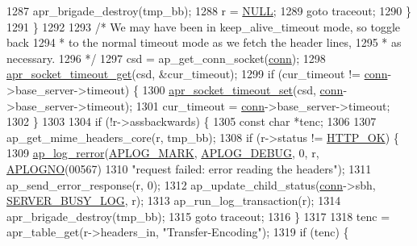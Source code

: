 \begin{DoxyCode}
{1287             apr\_brigade\_destroy(tmp\_bb);
1288             r = \hyperlink{pcre_8txt_ad7f989d16aa8ca809a36bc392c07fba1}{NULL};
1289             \textcolor{keywordflow}{goto} traceout;
1290         \}
1291     \}
1292 
1293     \textcolor{comment}{/* We may have been in keep\_alive\_timeout mode, so toggle back}
1294 \textcolor{comment}{     * to the normal timeout mode as we fetch the header lines,}
1295 \textcolor{comment}{     * as necessary.}
1296 \textcolor{comment}{     */}
1297     csd = ap\_get\_conn\_socket(\hyperlink{group__MOD__PROXY_gaaf2a99e7e3709d3e41bf0a33f1004b4e}{conn});
1298     \hyperlink{unix_2sockopt_8c_aa32313b54afed590367c8571075d2bc1}{apr\_socket\_timeout\_get}(csd, &cur\_timeout);
1299     \textcolor{keywordflow}{if} (cur\_timeout != \hyperlink{group__MOD__PROXY_gaaf2a99e7e3709d3e41bf0a33f1004b4e}{conn}->base\_server->timeout) \{
1300         \hyperlink{unix_2sockopt_8c_a945bdbe807ec5635d65a6fd9ddb78c29}{apr\_socket\_timeout\_set}(csd, \hyperlink{group__MOD__PROXY_gaaf2a99e7e3709d3e41bf0a33f1004b4e}{conn}->base\_server->timeout);
1301         cur\_timeout = \hyperlink{group__MOD__PROXY_gaaf2a99e7e3709d3e41bf0a33f1004b4e}{conn}->base\_server->timeout;
1302     \}
1303 
1304     \textcolor{keywordflow}{if} (!r->assbackwards) \{
1305         \textcolor{keyword}{const} \textcolor{keywordtype}{char} *tenc;
1306 
1307         ap\_get\_mime\_headers\_core(r, tmp\_bb);
1308         \textcolor{keywordflow}{if} (r->status != \hyperlink{group__HTTP__Status_ga02e6d59009dee759528ec81fc9a8eeff}{HTTP\_OK}) \{
1309             \hyperlink{group__APACHE__CORE__LOG_ga4c112558ccffd6b363da102b2052d2a6}{ap\_log\_rerror}(\hyperlink{group__APACHE__CORE__LOG_ga655e126996849bcb82e4e5a14c616f4a}{APLOG\_MARK}, \hyperlink{group__APACHE__CORE__LOG_gadfcef90537539cf2b7d35cfbbbafeb93}{APLOG\_DEBUG}, 0, r, 
      \hyperlink{group__APACHE__CORE__LOG_ga1dee8a07e06bc5b3de8b89662c2cd666}{APLOGNO}(00567)
1310                           \textcolor{stringliteral}{"request failed: error reading the headers"});
1311             ap\_send\_error\_response(r, 0);
1312             ap\_update\_child\_status(\hyperlink{group__MOD__PROXY_gaaf2a99e7e3709d3e41bf0a33f1004b4e}{conn}->sbh, \hyperlink{scoreboard_8h_a27a5c403b65794dc90e380a76a500924}{SERVER\_BUSY\_LOG}, r);
1313             ap\_run\_log\_transaction(r);
1314             apr\_brigade\_destroy(tmp\_bb);
1315             \textcolor{keywordflow}{goto} traceout;
1316         \}
1317 
1318         tenc = apr\_table\_get(r->headers\_in, \textcolor{stringliteral}{"Transfer-Encoding"});
1319         \textcolor{keywordflow}{if} (tenc) \{
}
\end{DoxyCode}
